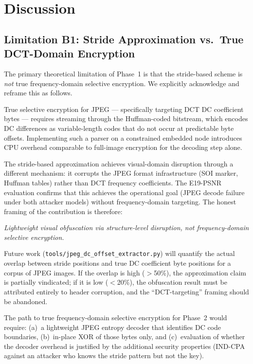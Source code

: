\documentclass[journal]{IEEEtran}
\begin{document}
\section{Discussion}
\label{sec:discussion}

\subsection{Limitation B1: Stride Approximation vs.\ True DCT-Domain Encryption}
\label{sec:limit_b1}

The primary theoretical limitation of Phase~1 is that the stride-based scheme
is \emph{not} true frequency-domain selective encryption.  We explicitly
acknowledge and reframe this as follows.

True selective encryption for JPEG --- specifically targeting DCT DC coefficient
bytes --- requires streaming through the Huffman-coded bitstream, which encodes
DC differences as variable-length codes that do not occur at predictable byte
offsets.  Implementing such a parser on a constrained embedded node introduces
CPU overhead comparable to full-image encryption for the decoding step alone.

The stride-based approximation achieves visual-domain disruption through a
different mechanism: it corrupts the JPEG format infrastructure (SOI marker,
Huffman tables) rather than DCT frequency coefficients.  The E19-PSNR evaluation
confirms that this achieves the operational goal (JPEG decode failure under both
attacker models) without frequency-domain targeting.  The honest framing of the
contribution is therefore:

\textit{Lightweight visual obfuscation via structure-level disruption, not
frequency-domain selective encryption.}

Future work (\texttt{tools/jpeg\_dc\_offset\_extractor.py}) will quantify the
actual overlap between stride positions and true DC coefficient byte positions
for a corpus of JPEG images.  If the overlap is high ($>$50\%), the
approximation claim is partially vindicated; if it is low ($<$20\%), the
obfuscation result must be attributed entirely to header corruption, and the
``DCT-targeting'' framing should be abandoned.

The path to true frequency-domain selective encryption for Phase~2 would
require: (a)~a lightweight JPEG entropy decoder that identifies DC code
boundaries, (b)~in-place XOR of those bytes only, and (c)~evaluation of
whether the decoder overhead is justified by the additional security properties
(IND-CPA against an attacker who knows the stride pattern but not the key).
\end{document}
